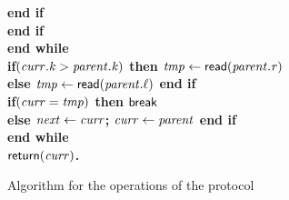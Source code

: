 \begin{figure}[h!]
{{\begin{minipage}[t]{150mm}
\begin{tabbing}
		 \>\>\>\> \bf{end if} \\
		 \>\>\> \bf{end if} \\
		 \>\> \bf{end while} \\
		 \>\> \bf{if}$(\ms{curr.k} > \ms{parent.k})$ \bf{then} $\ms{tmp} \gets \lit{read}(\ms{parent.r})$\label{line:par-read1} \\
		 \>\>\> \bf{else} $\ms{tmp} \gets \lit{read}(\ms{parent.\ell})$  \bf{end if} \label{line:par-read2} \\
		 \>\> \bf{if}$(\ms{curr} = \ms{tmp})$ \bf{then} $\lit{break}$ \label{line:par-check1} \\
		 \>\>\> \bf{else} $\ms{next} \gets \ms{curr}$; $\ms{curr} \gets \ms{parent}$  {\bf end if} \label{line:par-check2}  \label{line:par-check3} \\
 		 \> \bf{end while} \\
		 \> $\sf{return}(\ms{curr})$. \label{line:find-return} \\


\end{tabbing}
\normalsize
\end{minipage}
}
\caption{Algorithm for the operations of the protocol}
\label{fig:ttc-protocol}
}
\end{figure}
